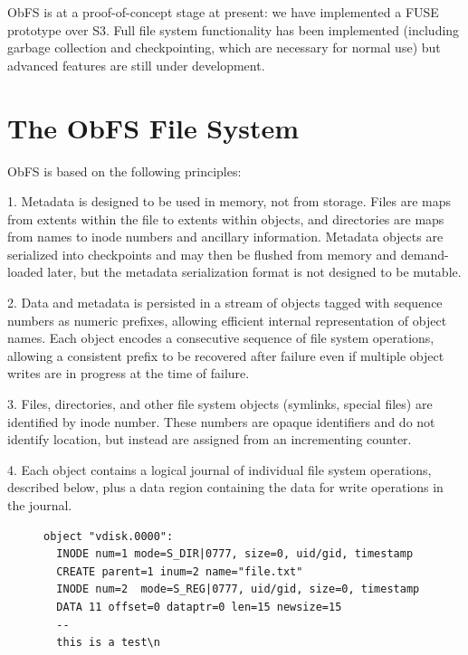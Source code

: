 \documentclass[sigconf,anonymous,10pt]{acmart}
\begin{document}
\begin{CCSXML}
ObFS is at a proof-of-concept stage at present: we have implemented a FUSE prototype over S3.
Full file system functionality has been implemented (including garbage collection and checkpointing, which are necessary for normal use) but advanced features are still under development.

\section{The ObFS File System}

ObFS is based on the following principles:

1. Metadata is designed to be used in memory, not from storage.
Files are maps from extents within the file to extents within objects, and directories are maps from names to inode numbers and ancillary information.
Metadata objects are serialized into checkpoints and may then be flushed from memory and demand-loaded later, but the metadata serialization format is not designed to be mutable.

2. Data and metadata is persisted in a stream of objects tagged with sequence numbers as numeric prefixes, allowing efficient internal representation of object names.
Each object encodes a consecutive sequence of file system operations, allowing a consistent prefix to be recovered after failure even if multiple object writes are in progress at the time of failure.

3. Files, directories, and other file system objects (symlinks, special files) are identified by inode number.
These numbers are opaque identifiers and do not identify location, but instead are assigned from an incrementing counter.

4. Each object contains a logical journal of individual file system operations, described below, plus a data region containing the data for write operations in the journal.

\begin{figure}
\begin{framed}
{\footnotesize 
\begin{verbatim}
object "vdisk.0000":
  INODE num=1 mode=S_DIR|0777, size=0, uid/gid, timestamp
  CREATE parent=1 inum=2 name="file.txt"
  INODE num=2  mode=S_REG|0777, uid/gid, size=0, timestamp
  DATA 11 offset=0 dataptr=0 len=15 newsize=15
  --
  this is a test\n
\end{verbatim} }
\end{framed}


\end{figure}
\end{CCSXML}
\end{document}
